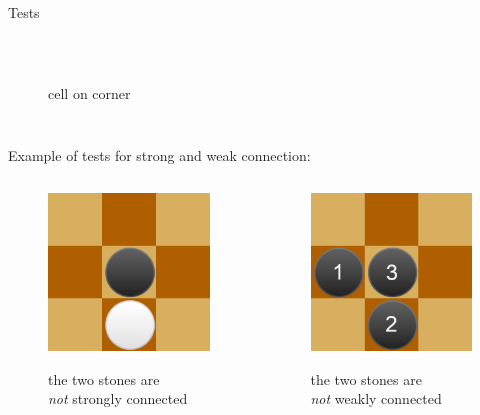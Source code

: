 \documentclass{beamer}
\begin{document}
\begin{frame}{Tests}
\begin{columns}
\begin{figure}
    \\cell on corner
\end{figure}
\end{columns}
	\vspace{0.9cm}
	Example of tests for strong and weak connection: 
	\begin{columns}
		\begin{figure}
			\includegraphics[scale=0.15]{images/test-strong-connection.png}
			
			the two stones are \\\textit{not} strongly connected
		\end{figure}
		
		\begin{figure}
			\includegraphics[scale=0.15]{images/test-weak-connection.png}
			
			the two stones are \\\textit{not} weakly connected
		\end{figure}
	\end{columns}
\end{frame}      
      
      
      
      
      
\end{document}
